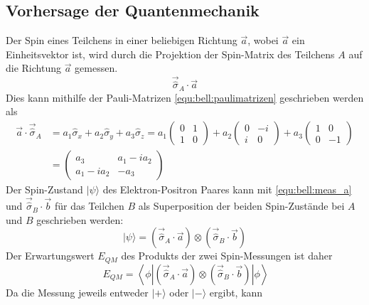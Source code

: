 \begin{refsection}
\subsection{Vorhersage der Quantenmechanik}
Der Spin eines Teilchens in einer beliebigen Richtung $\vec{a}$, wobei $\vec{a}$
ein Einheitsvektor ist, wird durch die
Projektion der Spin-Matrix des Teilchens $A$ auf die 
Richtung $\vec{a}$ gemessen.
\begin{equation}\label{equ:bell:meas_a}
    \vec{\hat{\sigma}}_A \cdot \vec{a}
\end{equation}
Dies kann mithilfe der Pauli-Matrizen \eqref{equ:bell:paulimatrizen} geschrieben
werden als
\begin{align}
    \vec{a} \cdot \vec{\hat{\sigma}}_A &= 
    a_1 \hat{\sigma}_x + a_2 \hat{\sigma}_y + a_3 \hat{\sigma}_z = 
    a_1 \begin{pmatrix} 0 & 1 \\ 1 & 0 \end{pmatrix} +
    a_2 \begin{pmatrix} 0 & -i \\ i & 0 \end{pmatrix} + 
    a_3 \begin{pmatrix} 1 & 0 \\ 0 & -1 \end{pmatrix} \\
    & = \begin{pmatrix}
       a_3 & a_1 - i a_2 \\
       a_1 - i a_2 & -a_3
    \end{pmatrix} \label{equ:bell:proj_a_s}
\end{align}
Der Spin-Zustand $|\psi\rangle$ des Elektron-Positron Paares kann mit
\eqref{equ:bell:meas_a} und $\vec{\hat{\sigma}}_B \cdot \vec{b}$ 
f\"ur das Teilchen $B$ als Superposition der beiden
Spin-Zust\"ande bei $A$ und $B$ geschrieben werden:
\begin{equation}
    |\psi\rangle = \left( \vec{\hat{\sigma}}_A \cdot \vec{a} \right)
        \otimes \left( \vec{\hat{\sigma}}_B \cdot \vec{b} \right)
\end{equation}
Der Erwartungswert $E_{QM}$ des Produkts der zwei Spin-Messungen
ist daher
\begin{equation}\
    E_{QM} = \left\langle \phi \left| 
    \left( \vec{\hat{\sigma}}_A \cdot \vec{a} \right)
            \otimes \left( \vec{\hat{\sigma}}_B \cdot \vec{b} \right)
    \right| \phi \right\rangle
\end{equation}
Da die Messung jeweils entweder $|+\rangle$ oder $|-\rangle$ ergibt, kann

\end{refsection}
